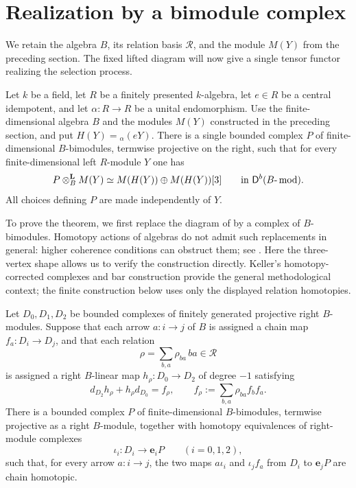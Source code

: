 \section{Realization by a bimodule complex}
\label{sec:realization}

We retain the algebra \(B\), its relation basis \(\mathcal R\), and the
module \(M(Y)\) from the preceding section. The fixed lifted diagram
will now give a single tensor functor realizing the selection process.

\begin{theorem}\label{thm:realization}
Let \(k\) be a field, let \(R\) be a finitely presented \(k\)-algebra,
let \(e\in R\) be a central idempotent, and let
\(\alpha:R\to R\) be a unital endomorphism.
Use the finite-dimensional algebra \(B\) and the modules \(M(Y)\)
constructed in the preceding section, and put
\(H(Y)={}_{\alpha}(eY)\).
There is a single bounded complex \(P\) of finite-dimensional
\(B\)-bimodules, termwise projective on the right, such that for
every finite-dimensional left \(R\)-module \(Y\) one has
\begin{equation}\label{eq:realization}
 P\otimes^{\mathbf L}_B M(Y)
 \simeq M(H(Y))\oplus M(H(Y))[3]
 \qquad\text{in }\mathsf D^b(B\text{-}\operatorname{mod}).
\end{equation}
All choices defining \(P\) are made independently of \(Y\).
\end{theorem}

To prove the theorem, we first replace the diagram of
 by a complex of \(B\)-bimodules.
Homotopy actions of algebras do not admit such replacements in general:
higher coherence conditions can obstruct them; see
\cite[Sections~2 and~6]{Keller2000}.  Here the three-vertex shape allows
us to verify the construction directly. Keller's homotopy-corrected
complexes and bar construction \cite[Sections~3 and~7]{Keller2000}
provide the general methodological context; the finite construction
below uses only the displayed relation homotopies.

\begin{lemma}\label{lem:rectification}
Let \(D_0,D_1,D_2\) be bounded complexes of finitely generated projective
right \(B\)-modules.  Suppose that each arrow \(a:i\to j\) of \(B\)
is assigned a chain map \(f_a:D_i\to D_j\), and that each relation
\[
 \rho=\sum_{b,a}\rho_{ba}\,ba\in\mathcal R
\]
is assigned a right \(B\)-linear map \(h_\rho:D_0\to D_2\) of degree
\(-1\) satisfying
\[
 d_{D_2}h_\rho+h_\rho d_{D_0}
 = f_\rho,\qquad
 f_\rho:=\sum_{b,a}\rho_{ba}f_bf_a .
\]
There is a bounded complex \(P\) of finite-dimensional \(B\)-bimodules,
termwise projective as a right \(B\)-module, together with homotopy
equivalences of right-module complexes
\[
 \iota_i:D_i\longrightarrow \mathbf e_iP \qquad (i=0,1,2),
\]
such that, for every arrow \(a:i\to j\), the two maps
\(a\iota_i\) and \(\iota_jf_a\) from \(D_i\) to \(\mathbf e_jP\)
are chain homotopic.
\end{lemma}

